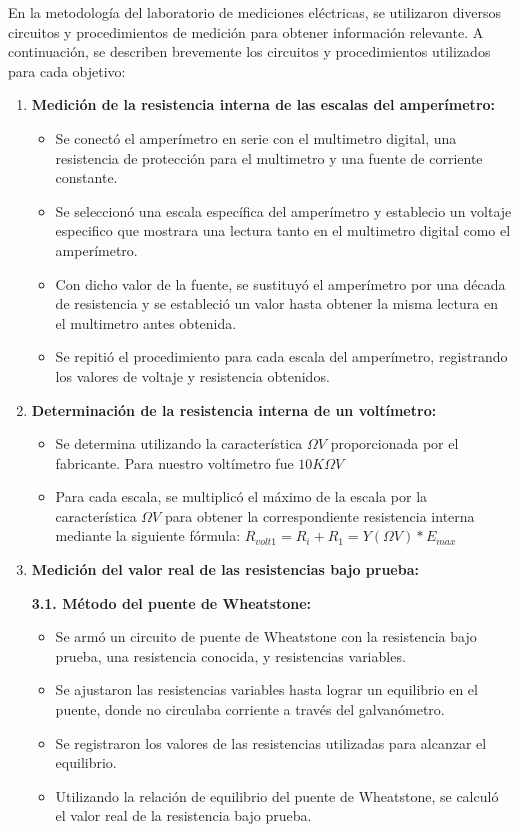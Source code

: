 \documentclass[12pt]{article}
\begin{document}
	En la metodología del laboratorio de mediciones eléctricas, se utilizaron diversos circuitos y procedimientos de medición para obtener información relevante. A continuación, se describen brevemente los circuitos y procedimientos utilizados para cada objetivo:\\
	
	\begin{enumerate}
		\item \textbf{Medición de la resistencia interna de las escalas del amperímetro:}
		
		\begin{itemize}
			\item Se conectó el amperímetro en serie con el multimetro digital, una resistencia de protección para el multimetro y una fuente de corriente constante.
			\item Se seleccionó una escala específica del amperímetro y establecio un voltaje especifico que mostrara una lectura tanto en el multimetro digital como el amperímetro.
			\item Con dicho valor de la fuente, se sustituyó el amperímetro por una década de resistencia y se estableció un valor hasta obtener la misma lectura en el multimetro antes obtenida. 
			\item Se repitió el procedimiento para cada escala del amperímetro, registrando los valores de voltaje y resistencia obtenidos.
		\end{itemize}
		
		\item \textbf{Determinación de la resistencia interna de un voltímetro:}
		
		\begin{itemize}
			\item Se determina utilizando la característica $\Omega V$ proporcionada por el fabricante. Para nuestro voltímetro fue $10K\Omega V$
			\item Para cada escala, se multiplicó el máximo de la
			escala por la característica $\Omega V$ para obtener la correspondiente resistencia interna mediante la siguiente fórmula: $R_{volt1} = R_{i} + R_{1} = Y(\Omega V) * E_{max}$ 
		\end{itemize}
		
		\item \textbf{Medición del valor real de las resistencias bajo prueba:}
		
		\textbf{3.1. Método del puente de Wheatstone:}
		
		\begin{itemize}
			\item Se armó un circuito de puente de Wheatstone con la resistencia bajo prueba, una resistencia conocida, y resistencias variables.
			\item Se ajustaron las resistencias variables hasta lograr un equilibrio en el puente, donde no circulaba corriente a través del galvanómetro.
			\item Se registraron los valores de las resistencias utilizadas para alcanzar el equilibrio.
			\item Utilizando la relación de equilibrio del puente de Wheatstone, se calculó el valor real de la resistencia bajo prueba.
		\end{itemize}
		

\end{enumerate}
\end{document}
